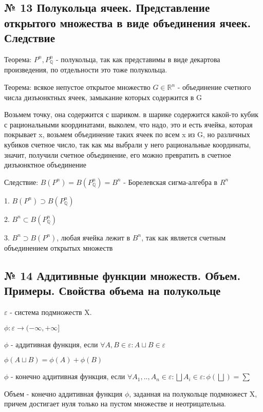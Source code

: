 \documentclass{article}
\begin{document}
\subsection{ \footnotesize № 13 Полукольца ячеек. Представление открытого множества в виде объединения ячеек. Следствие}

Теорема: $P^n, P_\mathbb{Q}^n$ - полукольца, так как представимы в виде декартова произведения, по отдельности это тоже полукольца.

Теорема: всякое непустое открытое множество $G \in \mathbb{R}^n$ - объединение счетного числа дизъюнктных ячеек, замыкание которых содержится в G

Возьмем точку, она содержится с шариком. в шарике содержится какой-то кубик с рациональными координатами, выколем, что надо, это и есть ячейка, которая покрывает x, возьмем объединение таких ячеек по всем x из G, но различных кубиков счетное число, так как мы выбрали у него рациональные координаты, значит, получили счетное объединение, его можно превратить в счетное дизъюнктное объединение

Следствие: $B(P^n) = B(P_\mathbb{Q}^n) = B^n$ - Борелевская сигма-алгебра в $R^n$

1. $B(P^n) \supset B(P_\mathbb{Q}^n)$

2. $B^n \subset B(P_\mathbb{Q}^n)$

3. $B^n \supset B(P^n)$, любая ячейка лежит в $B^n$, так как является счетным объединением открытых множеств

\subsection{ \footnotesize № 14 Аддитивные функции множеств. Объем. Примеры. Свойства объема на полукольце}

$\varepsilon$ - система подмножеств X.

$\phi : \varepsilon \rightarrow (-\infty, +\infty]$

$\phi$ - аддитивная функция, если $\forall A, B \in \varepsilon : A \sqcup B \in \varepsilon$

$\phi(A \sqcup B) = \phi(A) + \phi(B)$

$\phi$ - конечно аддитивная функция, если $\forall A_1, .. , A_n \in \varepsilon : \bigsqcup{A_i} \in \varepsilon : \phi(\bigsqcup) = \sum$

Объем - конечно аддитивная функция $\phi$, заданная на полукольце подмножест X, причем достигает нуля только на пустом множестве и неотрицательна.
\end{document}
